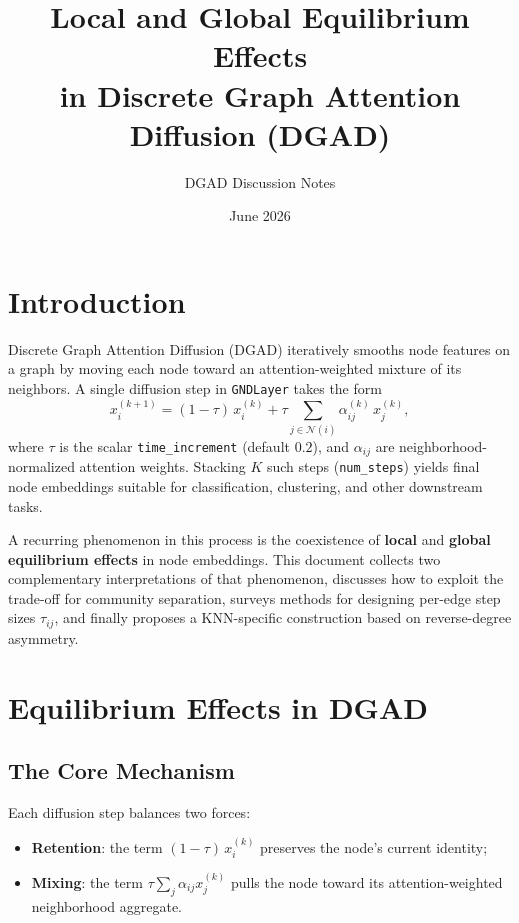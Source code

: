 \documentclass[11pt,a4paper]{report}
\title{Local and Global Equilibrium Effects\\in Discrete Graph Attention Diffusion (DGAD)}
\author{DGAD Discussion Notes}
\date{June 2026}
\begin{document}
\maketitle
\tableofcontents
\newpage

\chapter{Introduction}

Discrete Graph Attention Diffusion (DGAD) iteratively smooths node features on a graph by moving each node toward an attention-weighted mixture of its neighbors. A single diffusion step in \texttt{GNDLayer} takes the form
\begin{equation}
    x_i^{(k+1)} = (1-\tau)\, x_i^{(k)} + \tau \sum_{j \in \mathcal{N}(i)} \alpha_{ij}^{(k)}\, x_j^{(k)},
    \label{eq:node-tau}
\end{equation}
where $\tau$ is the scalar \texttt{time\_increment} (default $0.2$), and $\alpha_{ij}$ are neighborhood-normalized attention weights. Stacking $K$ such steps (\texttt{num\_steps}) yields final node embeddings suitable for classification, clustering, and other downstream tasks.

A recurring phenomenon in this process is the coexistence of \textbf{local} and \textbf{global equilibrium effects} in node embeddings. This document collects two complementary interpretations of that phenomenon, discusses how to exploit the trade-off for community separation, surveys methods for designing per-edge step sizes $\tau_{ij}$, and finally proposes a KNN-specific construction based on reverse-degree asymmetry.

\chapter{Equilibrium Effects in DGAD}

\section{The Core Mechanism}

Each diffusion step balances two forces:
\begin{itemize}[noitemsep]
    \item \textbf{Retention}: the term $(1-\tau)\, x_i^{(k)}$ preserves the node's current identity;
    \item \textbf{Mixing}: the term $\tau \sum_j \alpha_{ij} x_j^{(k)}$ pulls the node toward its attention-weighted neighborhood aggregate.
\end{itemize}
\end{document}
